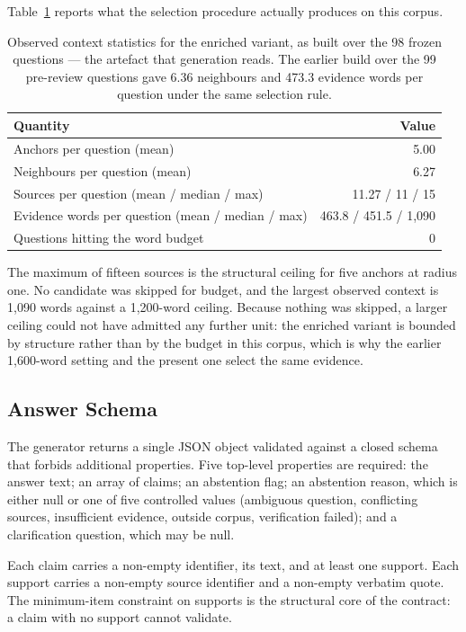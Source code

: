 Table~\ref{tab:context-stats} reports what the selection procedure actually produces on this corpus.

\begin{table}[htbp]
  \centering
  \caption{Observed context statistics for the enriched variant, as built over the 98 frozen questions --- the artefact that generation reads. The earlier build over the 99 pre-review questions gave 6.36 neighbours and 473.3 evidence words per question under the same selection rule.}
  \label{tab:context-stats}
  \begin{tabular}{lr}
    \toprule
    \textbf{Quantity} & \textbf{Value} \\
    \midrule
    Anchors per question (mean) & 5.00 \\
    Neighbours per question (mean) & 6.27 \\
    Sources per question (mean / median / max) & 11.27 / 11 / 15 \\
    Evidence words per question (mean / median / max) & 463.8 / 451.5 / 1,090 \\
    Questions hitting the word budget & 0 \\
    \bottomrule
  \end{tabular}
\end{table}

The maximum of fifteen sources is the structural ceiling for five anchors at radius one. No candidate was skipped for budget, and the largest observed context is 1{,}090 words against a 1{,}200-word ceiling. Because nothing was skipped, a larger ceiling could not have admitted any further unit: the enriched variant is bounded by structure rather than by the budget in this corpus, which is why the earlier 1{,}600-word setting and the present one select the same evidence.

\subsection{Answer Schema}

The generator returns a single JSON object validated against a closed schema that forbids additional properties. Five top-level properties are required: the answer text; an array of claims; an abstention flag; an abstention reason, which is either null or one of five controlled values (ambiguous question, conflicting sources, insufficient evidence, outside corpus, verification failed); and a clarification question, which may be null.

Each claim carries a non-empty identifier, its text, and at least one support. Each support carries a non-empty source identifier and a non-empty verbatim quote. The minimum-item constraint on supports is the structural core of the contract: a claim with no support cannot validate.

